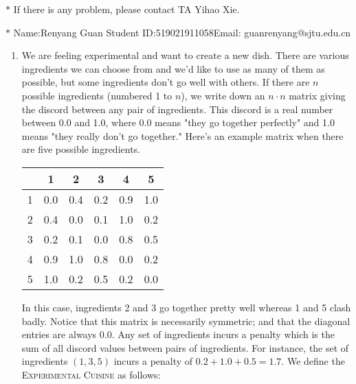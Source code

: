 \documentclass[12pt,a4paper]{article}
\theoremstyle{definition}
\begin{document}
\noindent

\noindent{}
\begin{center}
\footnotesize{\color{red}$*$ If there is any problem, please contact TA Yihao Xie. }

\footnotesize{\color{blue}$*$ Name:Renyang Guan  \quad Student ID:519021911058\quad Email: guanrenyang@sjtu.edu.cn}
\end{center}

\begin{enumerate}
    \item We are feeling experimental and want to create a new dish. There are various ingredients we can choose from and we'd like to use as many of them as possible, but some ingredients don't go well with others. If there are $n$ possible ingredients (numbered 1 to $n$), we write down an $n\cdot n$ matrix giving the discord between any pair of ingredients. This discord is a real number between 0.0 and 1.0, where 0.0 means "they go together perfectly" and 1.0 means "they really don't go together." Here's an example matrix when there are five possible ingredients.
    \begin{center}
        \begin{tabular}{|c|ccccc|}
        \hline
             & 1  & 2 & 3 & 4 & 5\\
        \hline
            1 & 0.0 & 0.4 & 0.2 & 0.9 & 1.0\\
            2 & 0.4 & 0.0 & 0.1 & 1.0 & 0.2\\
            3 & 0.2 & 0.1 & 0.0 & 0.8 & 0.5\\
            4 & 0.9 & 1.0 & 0.8 & 0.0 & 0.2\\
            5 & 1.0 & 0.2 & 0.5 & 0.2 & 0.0\\
        \hline
        \end{tabular}
    \end{center}
    In this case, ingredients 2 and 3 go together pretty well whereas 1 and 5 clash badly. Notice that this matrix is necessarily symmetric; and that the diagonal entries are always 0.0. Any set of ingredients incurs a penalty which is the sum of all discord values between pairs of ingredients. For instance, the set of ingredients $(1,3,5)$ incurs a penalty of $0.2+1.0+0.5 = 1.7$. We define the \textsc{Experimental Cuisine} as follows:


\end{enumerate}
\end{document}
